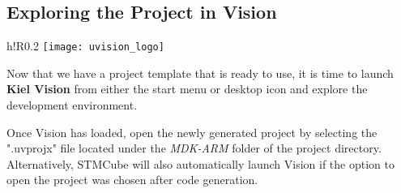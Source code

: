 \documentclass[11pt,fleqn]{book} %
\begin{document}
%


\subsection{Exploring the Project in {\textmu}Vision}

    \begin{wrapfigure}[8]{h!R}{0.2\textwidth}
    \centering\texttt{[image: uvision\_logo]}
    \label{uvision_logo}
    \end{wrapfigure}

Now that we have a project template that is ready to use, it is time to launch \textbf{Kiel {\textmu}Vision} from either the start menu or desktop icon and explore the development environment. 

Once {\textmu}Vision has loaded, open the newly generated project by selecting the ".uvprojx" file located under the \textit{MDK-ARM} folder of the project directory. Alternatively, STMCube will also automatically launch {\textmu}Vision if the option to open the project was chosen after code generation. 
\end{document}

